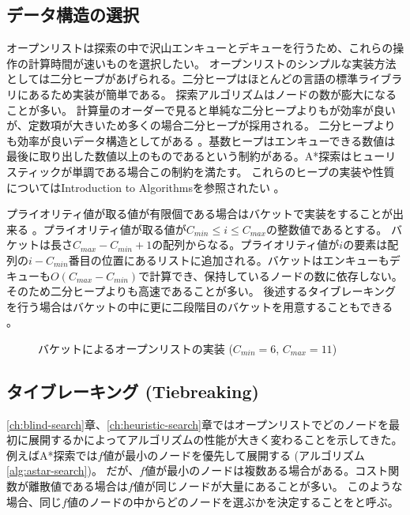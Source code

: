 \subsection{データ構造の選択}
\label{sec:priority-queue}

オープンリストは探索の中で沢山エンキューとデキューを行うため、これらの操作の計算時間が速いものを選択したい。
オープンリストのシンプルな実装方法としては二分ヒープがあげられる。二分ヒープはほとんどの言語の標準ライブラリにあるため実装が簡単である。
探索アルゴリズムはノードの数が膨大になることが多い。
計算量のオーダーで見ると単純な二分ヒープよりもが効率が良いが、定数項が大きいため多くの場合二分ヒープが採用される。
二分ヒープよりも効率が良いデータ構造としてがある \cite{ahuja1990faster}。基数ヒープはエンキューできる数値は最後に取り出した数値以上のものであるという制約がある。A*探索はヒューリスティックが単調である場合この制約を満たす。
これらのヒープの実装や性質についてはIntroduction to Algorithmsを参照されたい \cite{cormen01}。

プライオリティ値が取る値が有限個である場合はバケットで実装をすることが出来る \cite{burns2012implementing}。プライオリティ値が取る値が$C_{min} \leq i \leq C_{max}$の整数値であるとする。
バケットは長さ$C_{max} - C_{min} + 1$の配列からなる。プライオリティ値が$i$の要素は配列の$i - C_{min}$番目の位置にあるリストに追加される。バケットはエンキューもデキューも$O(C_{max} - C_{min})$で計算でき、保持しているノードの数に依存しない。そのため二分ヒープよりも高速であることが多い。
後述するタイブレーキングを行う場合はバケットの中に更に二段階目のバケットを用意することもできる \cite{burns2012implementing}。

\begin{figure}
  \centering
  \begin{tikzpicture}[scale=0.6]
    
  \end{tikzpicture}
  \caption{バケットによるオープンリストの実装 ($C_{min} = 6$, $C_{max} = 11$)}
  \label{fig:bucket}
\end{figure}


\subsection{タイブレーキング (Tiebreaking)}
\label{sec:tiebreaking}

\ref{ch:blind-search}章、\ref{ch:heuristic-search}章ではオープンリストでどのノードを最初に展開するかによってアルゴリズムの性能が大きく変わることを示してきた。
例えばA*探索では$f$値が最小のノードを優先して展開する (アルゴリズム\ref{alg:astar-search})。
だが、$f$値が最小のノードは複数ある場合がある。コスト関数が離散値である場合は$f$値が同じノードが大量にあることが多い。
このような場合、同じ$f$値のノードの中からどのノードを選ぶかを決定することをと呼ぶ。

